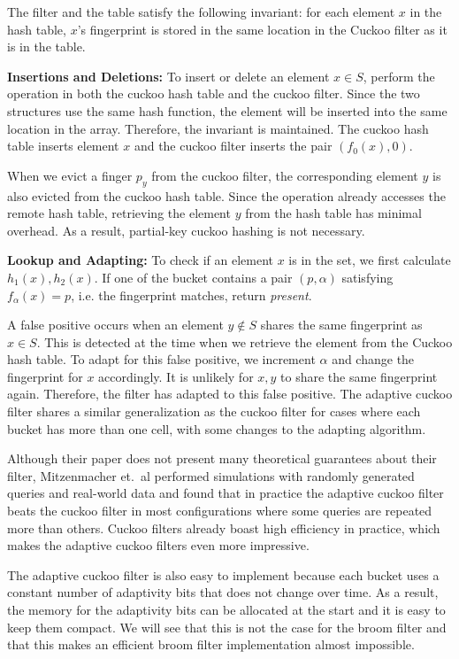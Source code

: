 \documentclass[../paper.tex]{subfiles}
\begin{document}
The filter and the table satisfy the following invariant: for each element $x$ in the hash table, $x$'s fingerprint is stored in the same location in the Cuckoo filter as it is in the table.

\textbf{Insertions and Deletions:} To insert or delete an element $x\in S$, perform the operation in both the cuckoo hash table and the cuckoo filter.
Since the two structures use the same hash function, the element will be inserted into the same location in the array. Therefore, the invariant is maintained.
The cuckoo hash table inserts element $x$ and the cuckoo filter inserts the pair $(f_0(x),0)$.

When we evict a finger $p_y$ from the cuckoo filter, the corresponding element $y$ is also evicted from the cuckoo hash table.
Since the operation already accesses the remote hash table, retrieving the element $y$ from the hash table has minimal overhead. As a result, partial-key cuckoo hashing is not necessary.

\textbf{Lookup and Adapting:} To check if an element $x$ is in the set, we first calculate $h_1(x), h_2(x)$. If one of the bucket contains a pair $(p,\alpha)$ satisfying $f_\alpha(x)=p$, i.e. the fingerprint matches, return \textit{present}.

A false positive occurs when an element $y\not\in S$ shares the same fingerprint as $x\in S$. This is detected at the time when we retrieve the element from the
Cuckoo hash table. To adapt for this false positive, we increment $\alpha$ and change the fingerprint for $x$ accordingly. It is unlikely for $x,y$ to share the same fingerprint again.
Therefore, the filter has adapted to this false positive. The adaptive cuckoo filter shares a similar generalization as the cuckoo filter for cases where each bucket has more than one cell, with some changes to the adapting algorithm.

Although their paper does not present many theoretical guarantees about their filter, Mitzenmacher et.\ al performed simulations with randomly generated queries and real-world data and found that in practice the adaptive cuckoo filter beats the cuckoo filter in most configurations where some queries are repeated more than others. Cuckoo filters already boast high efficiency in practice, which makes the adaptive cuckoo filters even more impressive.

The adaptive cuckoo filter is also easy to implement because each bucket uses a constant number of adaptivity bits that does not change over time.
As a result, the memory for the adaptivity bits can be allocated at the start and it is easy to keep them compact. We will see that this is not the case
for the broom filter and that this makes an efficient broom filter implementation almost impossible.
\end{document}
